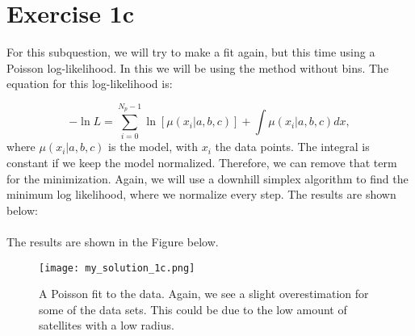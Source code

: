 \section{Exercise 1c}

For this subquestion, we will try to make a fit again, but this time using a Poisson log-likelihood. In this we will be using the method without bins. The equation for this log-likelihood is: 

\begin{equation}
    -\ln{L} = \sum^{N_p-1}_{i = 0} \ln{[\mu(x_i|a,b,c)] + \int \mu(x_i|a,b,c) dx}, 
\end{equation}
where $\mu(x_i|a,b,c)$ is the model, with $x_i$ the data points. The integral is constant if we keep the model normalized. Therefore, we can remove that term for the minimization. Again, we will use a downhill simplex algorithm to find the minimum log likelihood, where we normalize every step. The results are shown below: 
\\
\\



The results are shown in the Figure below.

\begin{figure}[h!]
  \centering
  \texttt{[image: my\_solution\_1c.png]}
  \caption{A Poisson fit to the data. Again, we see a slight overestimation for some of the data sets. This could be due to the low amount of satellites with a low radius.}
\end{figure}

